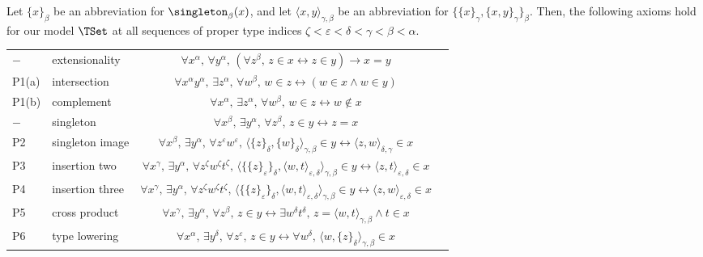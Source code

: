 \begin{theorem}
  \label{thm:ttt_consistent}
  Let \( \{ x \}_\beta \) be an abbreviation for \( \singleton_\beta(x) \), and let \( \langle x, y \rangle_{\gamma,\beta} \) be an abbreviation for \( \{ \{ x \}_\gamma, \{ x, y \}_\gamma \}_\beta \).
  Then, the following axioms hold for our model \( \TSet \) at all sequences of proper type indices \( \zeta < \varepsilon < \delta < \gamma < \beta < \alpha \).
  \begin{center}
    \begin{tabular}{llcl}
      \( - \) & extensionality & \( \forall x^\alpha,\, \forall y^\alpha,\, (\forall z^\beta,\, z \in x \leftrightarrow z \in y) \to x = y \) \\
      P1(a) & intersection & \( \forall x^\alpha y^\alpha,\, \exists z^\alpha,\, \forall w^\beta,\, w \in z \leftrightarrow (w \in x \wedge w \in y) \) \\
      P1(b) & complement & \( \forall x^\alpha,\, \exists z^\alpha,\, \forall w^\beta,\, w \in z \leftrightarrow w \notin x \) \\
      \( - \) & singleton & \( \forall x^\beta,\, \exists y^\alpha,\, \forall z^\beta,\, z \in y \leftrightarrow z = x \) \\
      P2 & singleton image & \( \forall x^\beta,\, \exists y^\alpha,\, \forall z^\varepsilon w^\varepsilon,\, \langle \{ z \}_\delta, \{ w \}_\delta \rangle_{\gamma,\beta} \in y \leftrightarrow \langle z, w \rangle_{\delta,\gamma} \in x \) \\
      P3 & insertion two & \( \forall x^\gamma,\, \exists y^\alpha,\, \forall z^\zeta w^\zeta t^\zeta,\, \langle \{ \{ z \}_\varepsilon \}_\delta, \langle w, t \rangle_{\varepsilon, \delta} \rangle_{\gamma,\beta} \in y \leftrightarrow \langle z, t \rangle_{\varepsilon,\delta} \in x \) \\
      P4 & insertion three & \( \forall x^\gamma,\, \exists y^\alpha,\, \forall z^\zeta w^\zeta t^\zeta,\, \langle \{ \{ z \}_\varepsilon \}_\delta, \langle w, t \rangle_{\varepsilon,\delta} \rangle_{\gamma,\beta} \in y \leftrightarrow \langle z, w \rangle_{\varepsilon,\delta} \in x \) \\
      P5 & cross product & \( \forall x^\gamma,\, \exists y^\alpha,\, \forall z^\beta,\, z \in y \leftrightarrow \exists w^\delta t^\delta,\, z = \langle w, t \rangle_{\gamma,\beta} \wedge t \in x \) \\
      P6 & type lowering & \( \forall x^\alpha,\, \exists y^\delta,\, \forall z^\varepsilon,\, z \in y \leftrightarrow \forall w^\delta,\, \langle w, \{ z \}_\delta \rangle_{\gamma,\beta} \in x \) \\

\end{tabular}
\end{center}
\end{theorem}
